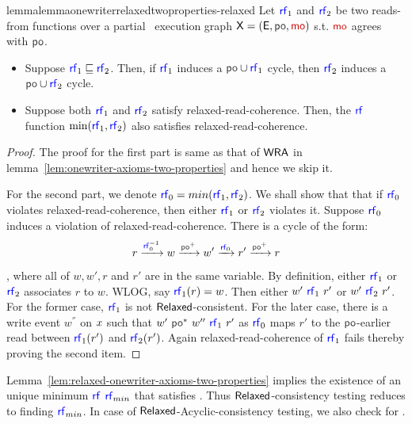 \begin{restatable}{lemma}{lemmaonewriterrelaxedtwoproperties-relaxed}
    \label{lem:relaxed-onewriter-axioms-two-properties}
Let $\rf_1$ and $\rf_2$ be two reads-from functions over a partial \onewriter\ execution graph $\ex=(\E, \po, \mo)$ s.t. $\mo$ agrees with $\po$. 
\begin{itemize}
\item Suppose $\rf_1 \sqsubseteq \rf_2$. Then, if $\rf_1$ induces a $\po \cup \rf_1$ cycle, then $\rf_2$ induces a $\po \cup \rf_2$ cycle.
\item Suppose both $\rf_1$ and $\rf_2$ satisfy relaxed-read-coherence. Then, the $\rf$ function $\min(\rf_1, \rf_2)$ also satisfies relaxed-read-coherence.
\end{itemize} 
\end{restatable}
\begin{proof}
 The proof for the first part is same as that of $\mathsf{WRA}$ in lemma~\ref{lem:onewriter-axioms-two-properties} and hence we skip it.
 
 For the second part, we denote $\rf_0=min(\rf_1,\rf_2)$. We shall show that that if $\rf_0$ violates relaxed-read-coherence, then either $\rf_1$ or $\rf_2$ violates it. Suppose $\rf_0$ induces a violation of relaxed-read-coherence. There is a cycle of the form:
 \[ r \xra{\rf_0^{-1}} w \xra{\po^+} w' \xra{\rf_0} r' \xra{\po^+} r\], where all of $w,w',r$ and $r'$ are in the same variable.
 By definition, either $\rf_1$ or $\rf_2$ associates $r$ to $w$. WLOG, say $\rf_1(r) = w$. Then either $w'~\rf_1~r'$ or $w'~\rf_2~r'$. For the former case, $\rf_1$ is not $\mathsf{Relaxed}$-consistent. For the later case,  there is a write event $w^{''}$ on $x$ such that $w'~\po^*~w{''}~\rf_1~r'$ as $\rf_0$ maps $r'$ to the $\po$-earlier read between $\rf_1(r')$ and $\rf_2(r')$. Again relaxed-read-coherence of $\rf_1$ fails thereby proving the second item. 
\end{proof}
Lemma~\ref{lem:relaxed-onewriter-axioms-two-properties} implies the existence of an unique minimum $\rf$ $\rf_{min}$ that satisfies \RlxRCoh{}. Thus $\mathsf{Relaxed}$-consistency testing  reduces to finding $\rf_{min}$. In case of $\mathsf{Relaxed}$-Acyclic-consistency testing, we also check for \PORF{}.

